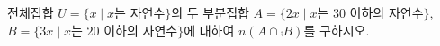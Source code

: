 전체집합 $U=\{x \mid x$는 자연수$\}$의 두 부분집합 $A=\{2x \mid x$는 $30$ 이하의 자연수$\}$, $B=\{3x \mid x$는 $20$ 이하의 자연수$\}$에 대하여 $n(A\cap\comp{B})$를 구하시오.
